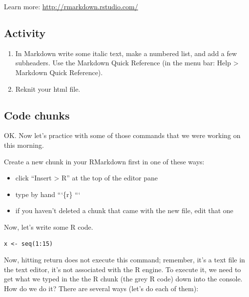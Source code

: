 \documentclass[]{book}
\providecommand{\tightlist}{%
  \setlength{\itemsep}{0pt}\setlength{\parskip}{0pt}}
\begin{document}
Learn more: \url{http://rmarkdown.rstudio.com/}

\hypertarget{activity}{%
\subsection{Activity}\label{activity}}

\begin{enumerate}
\def\labelenumi{\arabic{enumi}.}
\tightlist
\item
  In Markdown write some italic text, make a numbered list, and add a few subheaders.
  Use the Markdown Quick Reference (in the menu bar: Help \textgreater{} Markdown Quick Reference).
\item
  Reknit your html file.
\end{enumerate}

\hypertarget{code-chunks}{%
\subsection{Code chunks}\label{code-chunks}}

OK. Now let's practice with some of those commands that we were working on this morning.

Create a new chunk in your RMarkdown first in one of these ways:

\begin{itemize}
\tightlist
\item
  click ``Insert \textgreater{} R'' at the top of the editor pane
\item
  type by hand
  ```\{r\}
  ```
\item
  if you haven't deleted a chunk that came with the new file, edit that one
\end{itemize}

Now, let's write some R code.

\begin{verbatim}
x <- seq(1:15)
\end{verbatim}

Now, hitting return does not execute this command; remember, it's a text file in the text editor, it's not associated with the R engine. To execute it, we need to get what we typed in the the R chunk (the grey R code) down into the console. How do we do it? There are several ways (let's do each of them):
\end{document}
